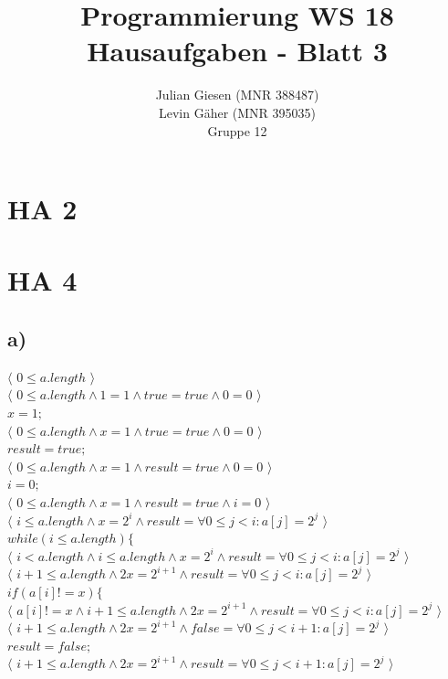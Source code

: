 \documentclass[a4paper]{article}
\title{ Programmierung WS 18 \\ Hausaufgaben - Blatt 3 }
\author{ Julian Giesen (MNR 388487) \\
Levin Gäher (MNR 395035) \\
Gruppe 12 }
\date{  }
\begin{document}
\maketitle

\section*{ HA 2 }

\section*{ HA 4 }

\subsection*{a)}
$\langle$ $0 \leq a.length$ $\rangle$\\
$\langle$ $0 \leq a.length \land 1=1 \land true = true \land 0 = 0$ $\rangle$\\
$x = 1;$ \\
$\langle$ $0 \leq a.length \land x=1 \land true = true \land 0 = 0$ $\rangle$\\
$result = true;$ \\
$\langle$ $0 \leq a.length \land x=1 \land result = true \land 0 = 0$ $\rangle$\\
$i = 0;$ \\
$\langle$ $0 \leq a.length \land x=1 \land result = true \land i = 0$ $\rangle$\\
$\langle$ $i \leq a.length \land x=2^i \land result = \forall 0 \leq j < i: a[j] = 2^j$ $\rangle$\\
$while (i \leq a.length) \{$ \\
$\langle$ $i < a.length \land i \leq a.length \land x=2^i \land result = \forall 0 \leq j < i: a[j] = 2^j$ $\rangle$\\
$\langle$ $i + 1 \leq a.length \land 2x=2^{i + 1} \land result = \forall 0 \leq j < i: a[j] = 2^j$ $\rangle$\\
$if (a[i] != x) \{$\\
$\langle$ $a[i] != x \land i + 1 \leq a.length \land 2x=2^{i + 1} \land result = \forall 0 \leq j < i: a[j] = 2^j$ $\rangle$\\
$\langle$ $i + 1 \leq a.length \land 2x=2^{i + 1} \land false = \forall 0 \leq j < i + 1: a[j] = 2^j$ $\rangle$\\
$result = false;$\\
$\langle$ $i + 1 \leq a.length \land 2x=2^{i + 1} \land result = \forall 0 \leq j < i + 1 : a[j] = 2^j$ $\rangle$\\
\end{document}
